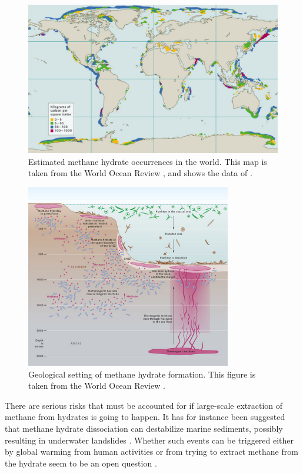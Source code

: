 \begin{figure}
\includegraphics[width=\textwidth]{../pictures/hydrate_map_nice.pdf}
\caption{Estimated methane hydrate occurrences in the world. This map is taken from the World Ocean Review \cite{Bucker2014}, and shows the data of \citet{Wallmann2012}.}
\label{fig:hydrate_map}
\end{figure}

\begin{figure}
\centering
\includegraphics[width=0.8\textwidth]{../pictures/geological_setting.pdf}
\caption{Geological setting of methane hydrate formation. This figure is taken from the World Ocean Review \cite{Bucker2014}.}
\label{fig:geological_setting}
\end{figure}

There are serious risks that must be accounted for if large-scale extraction of methane from hydrates is going to happen. It has for instance been suggested that methane hydrate dissociation can destabilize marine sediments, possibly resulting in underwater landslides \cite{Sultan2004379,Xu2006}. Whether such events can be triggered either by global warming from human activities or from trying to extract methane from the hydrate seem to be an open question \cite{Ning2012}.

